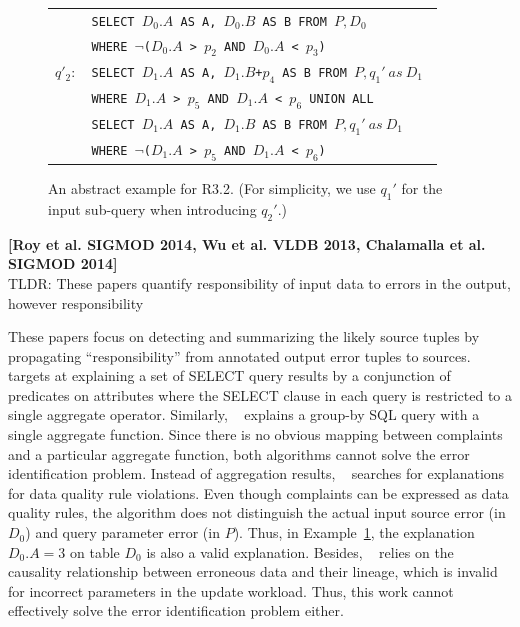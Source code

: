 \begin{figure}[t]
\begin{minipage}[t]{0.22\textwidth}
\begin{tabular}{p{2ex}p{55ex}}
        & \texttt{\small SELECT $D_0.A$ AS A, $D_0.B$ AS B FROM $P, D_0$ }\\
        &\texttt{\small  WHERE $\neg$($D_0.A$ > $p_2$ AND $D_0.A$ < $p_3$)} \\
        $q'_2:$ &
         \texttt{\small SELECT $D_1.A$ AS A, $D_1.B$+$p_4$ AS B FROM $P, q_1'\ as\ D_1$ } \\
        & \texttt{\small WHERE $D_1.A$ > $p_5$ AND $D_1.A$ < $p_6$ UNION ALL}\\
        & \texttt{\small SELECT $D_1.A$ AS A, $D_1.B$ AS B FROM $P, q_1'\ as\ D_1$ }\\
        &\texttt{\small  WHERE $\neg$($D_1.A$ > $p_5$ AND $D_1.A$ < $p_6$)} \\
        \end{tabular}
    \end{minipage}
    \caption{An abstract example for R3.2. (For simplicity, we use $q_1'$ for the input sub-query when introducing $q_2'$.)}
\label{fig:example}
\end{figure}

\noindent \textbf{[Roy et al. SIGMOD 2014, Wu et al. VLDB 2013, Chalamalla et al. SIGMOD 2014]} \\
TLDR: These papers quantify responsibility of input data to errors in the output, however responsibility


These papers focus on detecting and summarizing the likely source tuples by propagating ``responsibility'' from annotated output error tuples to sources. ~\cite{Wu13} targets at explaining a set of SELECT query results by a conjunction of predicates on attributes where the SELECT clause in each query is restricted to a single aggregate operator. 
Similarly, ~\cite{roy2014formal} explains a group-by SQL query with a single aggregate function. Since there is no obvious mapping between complaints and a particular aggregate function, both algorithms cannot solve the error identification problem. Instead of aggregation results, ~\cite{chalamalla2014} searches for explanations for data quality rule violations. Even though complaints can be expressed as data quality rules, the algorithm does not distinguish the actual input source error (in $D_0$) and query parameter error (in $P$). Thus, in Example~\ref{fig:example}, the explanation $D_0.A = 3$ on table $D_0$ is also a valid explanation. Besides, ~\cite{chalamalla2014} relies on the causality relationship between erroneous data and their lineage, which is invalid for incorrect parameters in the update workload. Thus, this work cannot effectively solve the error identification problem either.

